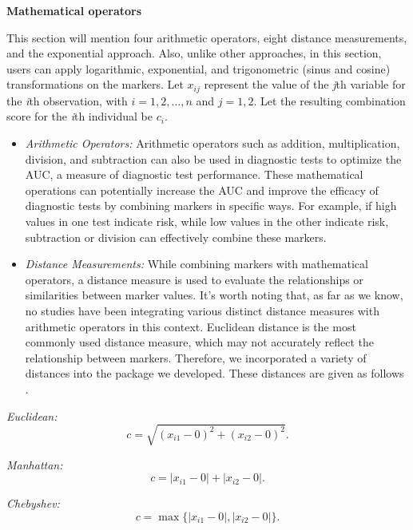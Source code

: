 \textbf{Mathematical operators}

This section will mention four arithmetic operators, eight distance measurements, and the exponential approach. Also, unlike other approaches, in this section, users can apply logarithmic, exponential, and trigonometric (sinus and cosine) transformations on the markers. Let \(x_{ij}\) represent the value of the \emph{j}th variable for the \emph{i}th observation, with \(i = 1, 2, \ldots, n\) and \(j = 1, 2\). Let the resulting combination score for the \emph{i}th individual be \(c_i\).

\begin{itemize}
\item
  \emph{Arithmetic Operators:}
  Arithmetic operators such as addition, multiplication, division, and subtraction can also be used in diagnostic tests to optimize the AUC, a measure of diagnostic test performance. These mathematical operations can potentially increase the AUC and improve the efficacy of diagnostic tests by combining markers in specific ways. For example, if high values in one test indicate risk, while low values in the other indicate risk, subtraction or division can effectively combine these markers.
\item
  \emph{Distance Measurements:}
  While combining markers with mathematical operators, a distance measure is used to evaluate the relationships or similarities between marker values. It's worth noting that, as far as we know, no studies have been integrating various distinct distance measures with arithmetic operators in this context. Euclidean distance is the most commonly used distance measure, which may not accurately reflect the relationship between markers. Therefore, we incorporated a variety of distances into the package we developed. These distances are given as follows \citep{minaev2018distance, pandit2011comparative, cha2007comprehensive}.
\end{itemize}

\emph{Euclidean:}
\begin{equation}
c = \sqrt{ (x_{i1} - 0)^2 + (x_{i2} - 0)^2 }.
  \label{eq:euclideanComb}
\end{equation}

\emph{Manhattan:}
\begin{equation}
c = |x_{i1} - 0| + |x_{i2} - 0|.
  \label{eq:manhattanComb}
\end{equation}

\emph{Chebyshev:}
\begin{equation}
c = \max\{ |x_{i1} - 0|, |x_{i2} - 0| \}.
  \label{eq:chebyshevComb}
\end{equation}

